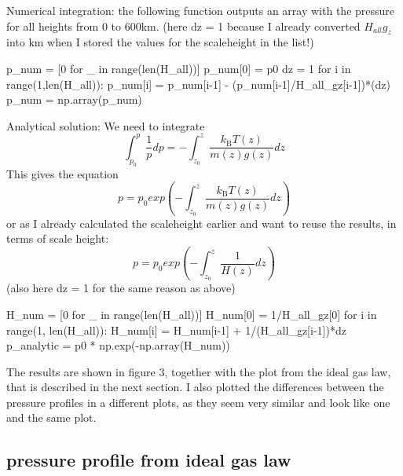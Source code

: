 \documentclass[a4paper, 12pt]{article}
\begin{document}
Numerical integration: the following function outputs an array with the pressure for all heights from 0 to 600km.
(here dz = 1 because I already converted $H_{all}g_z $ into km when I stored the values for the scaleheight in the list!) 
\begin{python}
p_num = [0 for _ in range(len(H_all))]
p_num[0] = p0
dz = 1
for i in range(1,len(H_all)):
    p_num[i] = p_num[i-1] - (p_num[i-1]/H_all_gz[i-1])*(dz)
p_num = np.array(p_num)
\end{python}
Analytical solution:
We need to integrate 
\begin{equation}
\int_{p_{0}}^{p} \frac{1}{p} dp  = -  \int_{z_{0}}^{z} \frac{k_{\text{B}}T(z)}{m(z)g(z)} dz 
\end{equation}
This gives the equation 
\begin{equation}
p = p_{0}exp(- \int_{z_{0}}^{z} \frac{k_{\text{B}}T(z)}{m(z)g(z)} dz )
\end{equation}
or as I already calculated the scaleheight earlier and want to reuse the results, in terms of scale height:
\begin{equation}
p = p_{0}exp(- \int_{z_{0}}^{z} \frac{1}{H(z)} dz )
\end{equation}
(also here dz = 1 for the same reason as above)
\begin{python}
H_num = [0 for _ in range(len(H_all))]
H_num[0] = 1/H_all_gz[0]
for i in range(1, len(H_all)):
    H_num[i] = H_num[i-1] + 1/(H_all_gz[i-1])*dz
p_analytic = p0 * np.exp(-np.array(H_num))
\end{python}
The results are shown in figure 3, together with the plot from the ideal gas law, that is described in the next section. I also plotted the differences between the pressure profiles in a different plots, as they seem very similar and look like one and the same plot. 

\subsection{pressure profile from ideal gas law}
\end{document}
